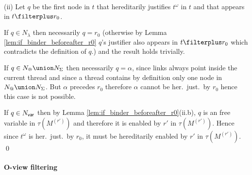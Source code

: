 (ii)
Let $q$ be the first node in $t$ that hereditarily justifies
$t^\omega$ in $t$ and that appears in $t\filterplus r_0$.


If $q \in N_\lambda$ then necessarily $q = r_0$
(otherwise by Lemma \ref{lem:if_binder_beforeafter_r0}
$q$'s justifier also appears in $t\filterplus r_0$ which contradicts
the definition of $q$.) and the result holds trivially.

If $q\in N_@\union N_\Sigma$ then necessarily $q=\alpha$, since
links always point inside the current thread and since a thread contains by definition only one node in $N_@\union N_\Sigma$. But $\alpha$ precedes $r_0$ therefore $\alpha$ cannot be her.\ just.\ by $r_0$ hence this case is not possible.

If $q \in N_{\sf var}$ then by Lemma \ref{lem:if_binder_beforeafter_r0}(ii.b),
$q$ is an free variable in $\tau(M^{(r')})$ and therefore
it is enabled by $r'$ in $\tau(M^{(r')})$. Hence since $t^\omega$ is her.\ just.\ by $r_0$, it must be hereditarily enabled
by $r'$ in $\tau(M^{(r')})$. \qed

\paragraph{O-view filtering}

